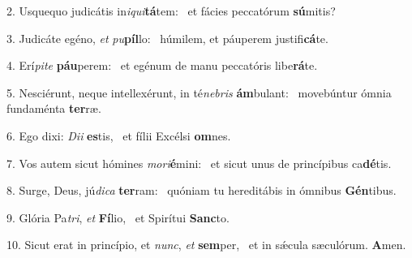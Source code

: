 2. Usquequo judicátis in\textit{i}\textit{qui}\textbf{tá}tem: \ast\  et fácies peccatórum \textbf{sú}mitis?\

3. Judicáte egéno, \textit{et} \textit{pu}\textbf{píl}lo: \ast\  húmilem, et páuperem justifi\textbf{cá}te.\

4. Erí\textit{pi}\textit{te} \textbf{páu}perem: \ast\  et egénum de manu peccatóris libe\textbf{rá}te.\

5. Nesciérunt, neque intellexérunt, in té\textit{ne}\textit{bris} \textbf{ám}bulant: \ast\  movebúntur ómnia fundaménta \textbf{ter}ræ.\

6. Ego dixi: \textit{Di}\textit{i} \textbf{es}tis, \ast\  et fílii Excélsi \textbf{om}nes.\

7. Vos autem sicut hómines \textit{mo}\textit{ri}\textbf{é}mini: \ast\  et sicut unus de princípibus ca\textbf{dé}tis.\

8. Surge, Deus, jú\textit{di}\textit{ca} \textbf{ter}ram: \ast\  quóniam tu hereditábis in ómnibus \textbf{Gén}tibus.\

9. Glória Pa\textit{tri}, \textit{et} \textbf{Fí}lio, \ast\  et Spirítui \textbf{Sanc}to.\

10. Sicut erat in princípio, et \textit{nunc}, \textit{et} \textbf{sem}per, \ast\  et in sǽcula sæculórum. \textbf{A}men.\

